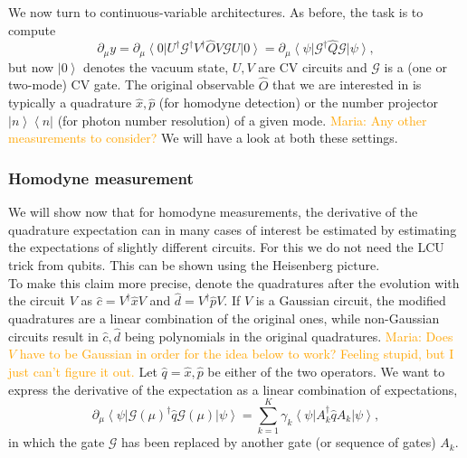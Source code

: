 \documentclass[aps,pra,10pt,twocolumn,groupedaddress,nofootinbib]{revtex4-1}
\theoremstyle{plain}
\newcommand{\ket}[1]{\ensuremath{\left| #1 \right \rangle}}
\newcommand{\bra}[1]{\ensuremath{\left \langle #1 \right |}}
\newcommand{\ketbra}[2]{\ket{#1}\bra{#2}}
\newcommand{\x}{\hat{x}}
\newcommand{\p}{\hat{p}}
\renewcommand{\c}{\hat{c}}
\renewcommand{\d}{\hat{d}}
\newcommand{\G}{\mathcal{G}}
\newcommand{\maria}[1]{\textcolor{orange}{Maria: #1}}
\begin{document}
We now turn to continuous-variable architectures. As before, the task is to compute 
\[\partial_{\mu}y = \partial_{\mu} \bra{0}U^{\dagger} \G^{\dagger} V^{\dagger} \hat{O}V \G U \ket{0} = \partial_{\mu} \bra{\psi} \G^{\dagger} \hat{Q} \G \ket{\psi},  \]
but now  $\ket{0}$ denotes the vacuum state, $U, V$ are CV circuits and $\G$ is a (one or two-mode) CV gate. The original observable $\hat{O}$ that we are interested in is typically a quadrature $\x, \p$ (for homodyne detection) or the number projector $\ketbra{n}{n}$ (for photon number resolution) of a given mode. \maria{Any other measurements to consider?} We will have a look at both these settings.


\subsubsection{Homodyne measurement}

We will show now that for homodyne measurements, the derivative of the quadrature expectation can in many cases of interest be estimated by estimating the expectations of slightly different circuits. For this we do not need the LCU trick from qubits. This can be shown using the Heisenberg picture. \\

To make this claim more precise, denote the quadratures after the evolution with the circuit $V$ as $\c = V^{\dagger} \x V$ and $\d = V^{\dagger} \p V$. If $V$ is a Gaussian circuit, the modified quadratures are a linear combination of the original ones, while non-Gaussian circuits result in $\c, \d$ being polynomials in the original quadratures. \maria{Does $V$ have to be Gaussian in order for the idea below to work? Feeling stupid, but I just can't figure it out.} Let $\hat{q} = \x, \p$ be either of the two operators. We want to express the derivative of the expectation as a linear combination of expectations,
\begin{equation}
	\partial_{\mu}\bra{\psi} \G(\mu)^{\dagger} \hat{q} \G(\mu) \ket{\psi} = \sum_{k=1}^K \gamma_k \bra{\psi} A_k^{\dagger} \hat{q} A_k \ket{\psi},
	\label{Eq:sumofsympl}
\end{equation}
in which the gate $\G$ has been replaced by another gate (or sequence of gates) $A_k$. \\
\end{document}
